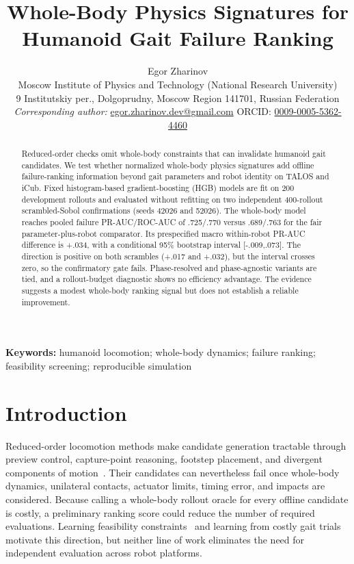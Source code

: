 \documentclass[letterpaper,10pt,conference]{IEEEtran}
\title{Whole-Body Physics Signatures for Humanoid Gait Failure Ranking}
\author{Egor Zharinov\\
\small Moscow Institute of Physics and Technology (National Research University)\\
\small 9 Institutskiy per., Dolgoprudny, Moscow Region 141701, Russian Federation\\
\small \textit{Corresponding author:}
\href{mailto:egor.zharinov.dev@gmail.com}{egor.zharinov.dev@gmail.com}
\quad ORCID:
\href{https://orcid.org/0009-0005-5362-4460}{0009-0005-5362-4460}}
\newcommand{\primarydelta}{.034}
\newcommand{\primaryci}{[-.009,.073]}
\newcommand{\bFourPRAUC}{.689}
\newcommand{\bFourROCAUC}{.763}
\newcommand{\bFivePRAUC}{.725}
\newcommand{\bFiveROCAUC}{.770}
\begin{document}
\maketitle

\begin{abstract}
Reduced-order checks omit whole-body constraints that can invalidate humanoid
gait candidates. We test whether normalized whole-body physics signatures add
offline failure-ranking information beyond gait parameters and robot identity
on TALOS and iCub. Fixed histogram-based gradient-boosting (HGB) models are fit
on 200 development rollouts and evaluated without refitting on two independent
400-rollout scrambled-Sobol confirmations (seeds 42026 and 52026). The
whole-body model reaches pooled failure PR-AUC/ROC-AUC of
\bFivePRAUC/\bFiveROCAUC{} versus \bFourPRAUC/\bFourROCAUC{} for the fair
parameter-plus-robot comparator. Its prespecified macro within-robot PR-AUC
difference is +\primarydelta{}, with a conditional 95\% bootstrap interval
\primaryci{}. The direction is positive on both scrambles (+.017 and +.032),
but the interval crosses zero, so the confirmatory gate fails. Phase-resolved
and phase-agnostic variants are tied, and a rollout-budget diagnostic shows no
efficiency advantage. The evidence suggests a modest whole-body ranking signal
but does not establish a reliable improvement.
\end{abstract}

\noindent\textbf{Keywords:} humanoid locomotion; whole-body dynamics; failure
ranking; feasibility screening; reproducible simulation

\section{Introduction}
Reduced-order locomotion methods make candidate generation tractable through
preview control, capture-point reasoning, footstep placement, and divergent
components of motion~\cite{kajita2003preview,pratt2006capture,herdt2010online,englsberger2015dcm}.
Their candidates can nevertheless fail once whole-body dynamics, unilateral
contacts, actuator limits, timing error, and impacts are considered. Because
calling a whole-body rollout oracle for every offline candidate is costly, a
preliminary ranking score could reduce the number of required evaluations.
Learning feasibility
constraints~\cite{carpentier2017feasibility} and learning from costly gait
trials~\cite{calandra2016gaits} motivate this direction, but neither line of
work eliminates the need for independent evaluation across robot platforms.
\end{document}

